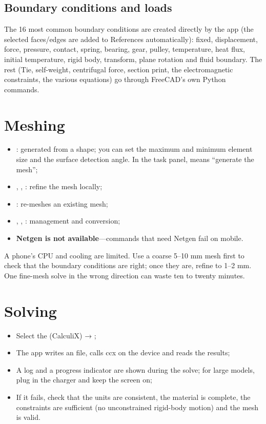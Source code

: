 \subsection{Boundary conditions and loads}

The 16 most common boundary conditions are created directly by the app (the selected faces/edges are added
to References automatically): fixed, displacement, force, pressure, contact, spring, bearing, gear, pulley,
temperature, heat flux, initial temperature, rigid body, transform, plane rotation and fluid boundary. The
rest (Tie, self-weight, centrifugal force, section print, the electromagnetic constraints, the various
equations) go through FreeCAD's own Python commands.

\section{Meshing}

\begin{itemize}
  \item {}: generated from a shape; you can set the maximum and minimum element size and the
        surface detection angle. In the task panel,  means ``generate the mesh'';
  \item {}, , : refine the mesh locally;
  \item {}: re-meshes an existing mesh;
  \item {}, , : management and conversion;
  \item \textbf{Netgen is not available}---commands that need Netgen fail on mobile.
\end{itemize}

\begin{tip}
A phone's CPU and cooling are limited. Use a coarse 5--10 mm mesh first to check that the boundary
conditions are right; once they are, refine to 1--2 mm. One fine-mesh solve in the wrong direction can
waste ten to twenty minutes.
\end{tip}

\section{Solving}

\begin{itemize}
  \item Select the  (CalculiX) → ;
  \item The app writes an  file, calls ccx on the device and reads the  results;
  \item A log and a progress indicator are shown during the solve; for large models, plug in the charger
        and keep the screen on;
  \item If it fails, check that the units are consistent, the material is complete, the constraints are
        sufficient (no unconstrained rigid-body motion) and the mesh is valid.
\end{itemize}


